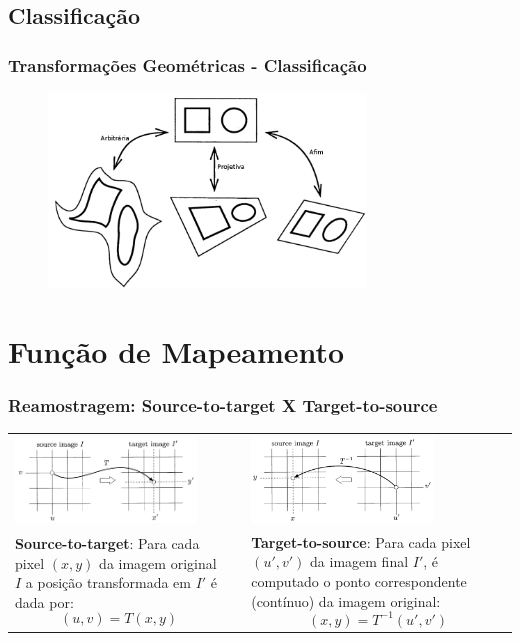 \documentclass{beamer}
\begin{document}
\subsection{Classificação}
\begin{frame}
 \frametitle{Transformações Geométricas - Classificação}
\begin{figure}[ht!]
  \centering
  \includegraphics[width=0.75\textwidth]{img/affine-projective-arbitrary.png}
\end{figure}
\end{frame}

\section{Função de Mapeamento}
\begin{frame}
\frametitle{Reamostragem: Source-to-target X Target-to-source}
\begin{tabular*}{0.75\textwidth}{ p{4cm} p{.6cm} p{4cm}}
\includegraphics[width=1.9in]{img/source-to-target-mapping.png}  & &
\includegraphics[width=1.9in]{img/target-to-source-mapping.png} \\
\scriptsize
\textbf{Source-to-target}: Para cada pixel $(x,y)$ da imagem original
$I$ a posição transformada em $I'$ é dada por: 
\begin{equation*}
 (u,v)=T(x,y)
\end{equation*} & &
\scriptsize
\textbf{Target-to-source}: Para cada pixel $(u',v')$ da imagem final
$I'$, é computado o ponto correspondente (contínuo) da imagem original: 
\begin{equation*}
 (x, y)=T^{-1}(u',v')
\end{equation*} \\
\end{tabular*}
\end{frame}
\end{document}
